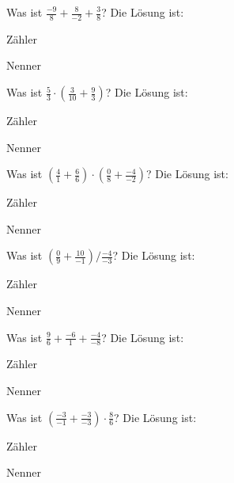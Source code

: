 \documentclass{ximera}
\begin{document}
\begin{shuffle}
\begin{question}
Was ist $\frac{-9}{8}+\frac{8}{-2}+\frac{3}{8}$?
Die Lösung ist:
\begin{solution}
Zähler 
\end{solution}
\begin{solution}
Nenner 
\end{solution}
\end{question}


\begin{question}
Was ist $\frac{5}{3}\cdot(\frac{3}{10}+\frac{9}{3})$?
Die Lösung ist:
\begin{solution}
Zähler 
\end{solution}
\begin{solution}
Nenner 
\end{solution}
\end{question}


\begin{question}
Was ist $(\frac{4}{1}+\frac{6}{6})\cdot(\frac{0}{8}+\frac{-4}{-2})$?
Die Lösung ist:
\begin{solution}
Zähler 
\end{solution}
\begin{solution}
Nenner 
\end{solution}
\end{question}


\begin{question}
Was ist $(\frac{0}{9}+\frac{10}{-1})/\frac{-4}{-3}$?
Die Lösung ist:
\begin{solution}
Zähler 
\end{solution}
\begin{solution}
Nenner 
\end{solution}
\end{question}


\begin{question}
Was ist $\frac{9}{6}+\frac{-6}{1}+\frac{-4}{-8}$?
Die Lösung ist:
\begin{solution}
Zähler 
\end{solution}
\begin{solution}
Nenner 
\end{solution}
\end{question}


\begin{question}
Was ist $(\frac{-3}{-1}+\frac{-3}{-3})\cdot\frac{8}{6}$?
Die Lösung ist:
\begin{solution}
Zähler 
\end{solution}
\begin{solution}
Nenner 
\end{solution}
\end{question}



\end{shuffle}
\end{document}
